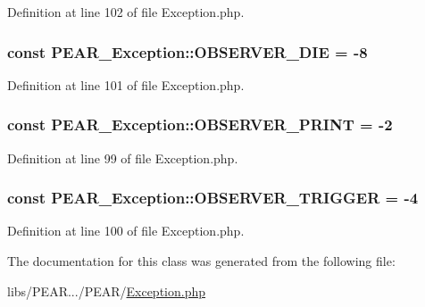 Definition at line 102 of file Exception.\+php.

\hypertarget{classPEAR__Exception_ad3ee7214450c1e14de99dbde12b8a60c}{}
\subsubsection[{O\+B\+S\+E\+R\+V\+E\+R\+\_\+\+D\+I\+E}]{\setlength{\rightskip}{0pt plus 5cm}const P\+E\+A\+R\+\_\+\+Exception\+::\+O\+B\+S\+E\+R\+V\+E\+R\+\_\+\+D\+I\+E = -\/8}\label{classPEAR__Exception_ad3ee7214450c1e14de99dbde12b8a60c}


Definition at line 101 of file Exception.\+php.

\hypertarget{classPEAR__Exception_afaa71d35f3fab453da2cef325b210423}{}
\subsubsection[{O\+B\+S\+E\+R\+V\+E\+R\+\_\+\+P\+R\+I\+N\+T}]{\setlength{\rightskip}{0pt plus 5cm}const P\+E\+A\+R\+\_\+\+Exception\+::\+O\+B\+S\+E\+R\+V\+E\+R\+\_\+\+P\+R\+I\+N\+T = -\/2}\label{classPEAR__Exception_afaa71d35f3fab453da2cef325b210423}


Definition at line 99 of file Exception.\+php.

\hypertarget{classPEAR__Exception_a0bf6d43a80c7f3bc2c7cfae062ff4477}{}
\subsubsection[{O\+B\+S\+E\+R\+V\+E\+R\+\_\+\+T\+R\+I\+G\+G\+E\+R}]{\setlength{\rightskip}{0pt plus 5cm}const P\+E\+A\+R\+\_\+\+Exception\+::\+O\+B\+S\+E\+R\+V\+E\+R\+\_\+\+T\+R\+I\+G\+G\+E\+R = -\/4}\label{classPEAR__Exception_a0bf6d43a80c7f3bc2c7cfae062ff4477}


Definition at line 100 of file Exception.\+php.



The documentation for this class was generated from the following file\+:\begin{DoxyCompactItemize}
\item 
libs/\+P\+E\+A\+R.../\+P\+E\+A\+R/\hyperlink{PEAR_2Exception_8php}{Exception.\+php}\end{DoxyCompactItemize}
